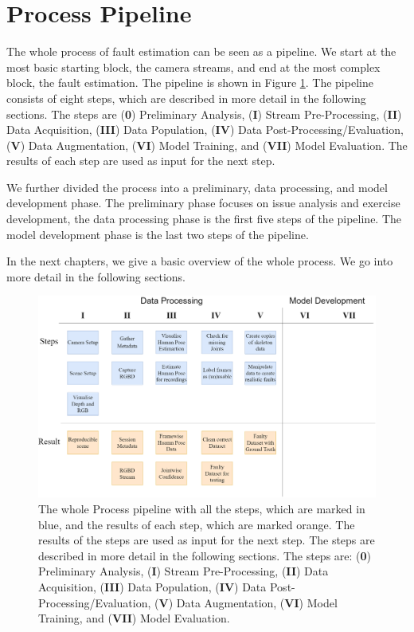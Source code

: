\section{Process Pipeline}
\label{sec:process_pipeline}

The whole process of fault estimation can be seen as a pipeline. We start at the most basic starting block, the camera streams, and end at the most complex block, the fault estimation. The pipeline is shown in Figure \ref{fig:process_pipeline}. The pipeline consists of eight steps, which are described in more detail in the following sections. The steps are (\textbf{0}) Preliminary Analysis, (\textbf{I}) Stream Pre-Processing, (\textbf{II}) Data Acquisition, (\textbf{III}) Data Population, (\textbf{IV}) Data Post-Processing/Evaluation, (\textbf{V}) Data Augmentation, (\textbf{VI}) Model Training, and (\textbf{VII}) Model Evaluation. The results of each step are used as input for the next step. 

We further divided the process into a preliminary, data processing, and model development phase. The preliminary phase focuses on issue analysis and exercise development, the data processing phase is the first five steps of the pipeline. The model development phase is the last two steps of the pipeline.

In the next chapters, we give a basic overview of the whole process. We go into more detail in the following sections.

\begin{figure}[ht]
    \centering
    \includegraphics[width=\textwidth]{figures/ProcessingPipeline/ProcessingPipeline.png}
    \caption[Process Pipeline with all steps]{The whole Process pipeline with all the steps, which are marked in blue, and the results of each step, which are marked orange. The results of the steps are used as input for the next step. The steps are described in more detail in the following sections. The steps are: (\textbf{0}) Preliminary Analysis, (\textbf{I}) Stream Pre-Processing, (\textbf{II}) Data Acquisition, (\textbf{III}) Data Population, (\textbf{IV}) Data Post-Processing/Evaluation, (\textbf{V}) Data Augmentation, (\textbf{VI}) Model Training, and (\textbf{VII}) Model Evaluation.}
    \label{fig:process_pipeline}
\end{figure}
